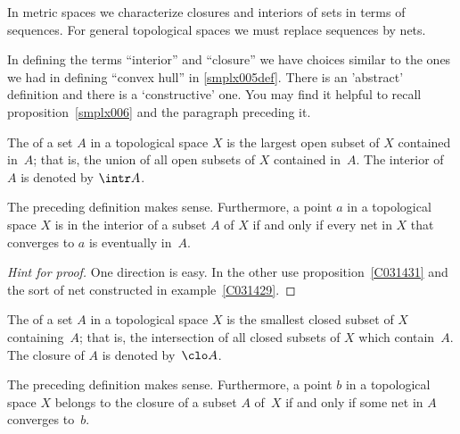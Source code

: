 In metric spaces we characterize closures and interiors of sets in terms of sequences. For
general topological spaces we must replace sequences by nets.

In defining the terms ``interior'' and ``closure'' we have choices similar to the ones we had in defining ``convex hull'' in
\ref{smplx005def}.  There is an 'abstract' definition and there is a `constructive' one.  You may find it helpful to recall
proposition~\ref{smplx006} and the paragraph preceding it.

\begin{defn}\label{def_interior} The
 of a set $A$ in a topological space $X$ is the largest open subset of $X$ contained in~$A$; that is, the
union of all open subsets of $X$ contained in~$A$. The interior of $A$
is denoted by $\intr A$.
\end{defn}

\begin{prop} The preceding definition makes sense.  Furthermore, a point $a$ in a topological space $X$ is in the interior of a subset
$A$ of $X$ if and only if every net in $X$ that converges to $a$ is eventually in~$A$.
\end{prop}

\begin{proof}[\emph{Hint for proof}]  One direction is easy. In the other use proposition~\ref{C031431} and the sort
of net constructed in example~\ref{C031429}.   \ns
\end{proof}

\begin{defn}\label{def_closure} The
 of a set $A$ in a topological space $X$ is the smallest closed subset of $X$ containing~$A$; that is, the
intersection of all closed subsets of $X$ which contain~$A$.  The closure of $A$
is denoted by~$\clo A$.
\end{defn}

\begin{prop}\label{C031481} The preceding definition makes sense.  Furthermore, a point $b$ in a topological space $X$ belongs to the
closure of a subset $A$ of~$X$ if and only if some net in $A$ converges to~$b$.
\end{prop}

